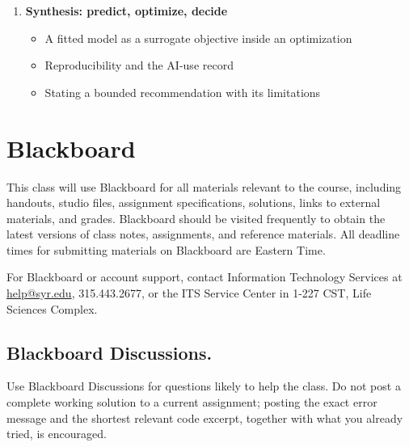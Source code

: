 \documentclass[11pt]{article}
\begin{document}
\begin{enumerate}
\begin{itemize}
          \item Classification as a decision rule; the confusion matrix
          \item Precision versus recall; choosing a threshold from real consequences
          \item \texttt{cross\_val\_score}; the model card as a deliverable
        \end{itemize}
  \item \textbf{Synthesis: predict, optimize, decide}
        \begin{itemize}
          \item A fitted model as a surrogate objective inside an optimization
          \item Reproducibility and the AI-use record
          \item Stating a bounded recommendation with its limitations
        \end{itemize}
\end{enumerate}

\section{Blackboard}

This class will use Blackboard for all materials relevant to the course, including handouts,
studio files, assignment specifications, solutions, links to external materials, and grades.
Blackboard should be visited frequently to obtain the latest versions of class notes,
assignments, and reference materials. All deadline times for submitting materials on
Blackboard are Eastern Time.

For Blackboard or account support, contact Information Technology Services at
\href{mailto:help@syr.edu}{help@syr.edu}, 315.443.2677, or the ITS Service Center in 1-227
CST, Life Sciences Complex.

\subsection{Blackboard Discussions.}

Use Blackboard Discussions for questions likely to help the class. Do not post a complete
working solution to a current assignment; posting the exact error message and the shortest
relevant code excerpt, together with what you already tried, is encouraged.

\end{document}
